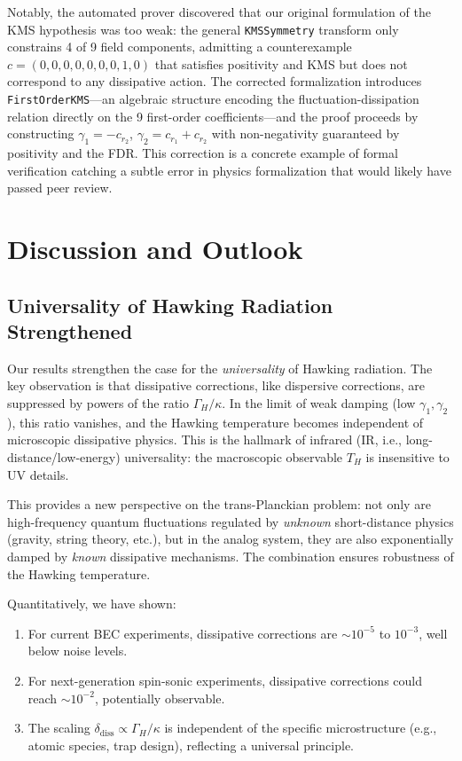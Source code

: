 \documentclass[aps,prl,twocolumn,superscriptaddress,nofootinbib,amsmath,amssymb]{revtex4-2}
\begin{document}
Notably, the automated prover discovered that our original formulation of the KMS hypothesis was too weak: the general \texttt{KMSSymmetry} transform only constrains 4 of 9 field components, admitting a counterexample $c = (0,0,0,0,0,0,0,1,0)$ that satisfies positivity and KMS but does not correspond to any dissipative action. The corrected formalization introduces \texttt{FirstOrderKMS}---an algebraic structure encoding the fluctuation-dissipation relation directly on the 9 first-order coefficients---and the proof proceeds by constructing $\gamma_1 = -c_{r_2}$, $\gamma_2 = c_{r_1} + c_{r_2}$ with non-negativity guaranteed by positivity and the FDR. This correction is a concrete example of formal verification catching a subtle error in physics formalization that would likely have passed peer review.

\section{Discussion and Outlook}
\label{sec:discussion}

\subsection{Universality of Hawking Radiation Strengthened}

Our results strengthen the case for the \textit{universality} of Hawking radiation. The key observation is that dissipative corrections, like dispersive corrections, are suppressed by powers of the ratio $\Gamma_H / \kappa$. In the limit of weak damping (low $\gamma_1, \gamma_2$), this ratio vanishes, and the Hawking temperature becomes independent of microscopic dissipative physics. This is the hallmark of infrared (IR, i.e., long-distance/low-energy) universality: the macroscopic observable $T_H$ is insensitive to UV details.

This provides a new perspective on the trans-Planckian problem: not only are high-frequency quantum fluctuations regulated by \textit{unknown} short-distance physics (gravity, string theory, etc.), but in the analog system, they are also exponentially damped by \textit{known} dissipative mechanisms. The combination ensures robustness of the Hawking temperature.

Quantitatively, we have shown:
\begin{enumerate}
\item For current BEC experiments, dissipative corrections are $\sim 10^{-5}$ to $10^{-3}$, well below noise levels.
\item For next-generation spin-sonic experiments, dissipative corrections could reach $\sim 10^{-2}$, potentially observable.
\item The scaling $\delta_{\text{diss}} \propto \Gamma_H / \kappa$ is independent of the specific microstructure (e.g., atomic species, trap design), reflecting a universal principle.
\end{enumerate}
\end{document}
